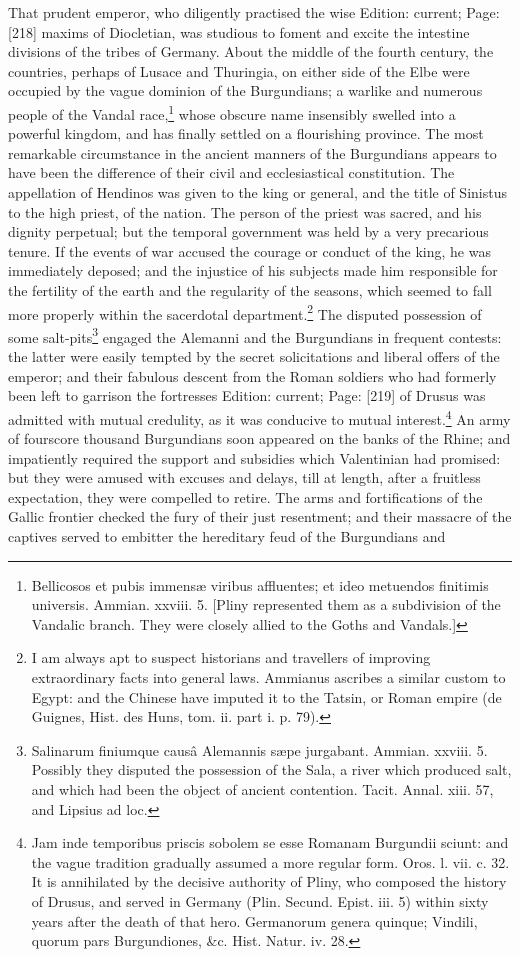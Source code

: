 That prudent emperor, who diligently practised the wise Edition: current; Page: [218] maxims of Diocletian, was studious to foment and excite the intestine divisions of the tribes of Germany. About the middle of the fourth century, the countries, perhaps of Lusace and Thuringia, on either side of the Elbe were occupied by the vague dominion of the Burgundians; a warlike and numerous people of the Vandal race,\footnote{Bellicosos et pubis immensæ viribus affluentes; et ideo metuendos finitimis universis. Ammian. xxviii. 5. [Pliny represented them as a subdivision of the Vandalic branch. They were closely allied to the Goths and Vandals.]} whose obscure name insensibly swelled into a powerful kingdom, and has finally settled on a flourishing province. The most remarkable circumstance in the ancient manners of the Burgundians appears to have been the difference of their civil and ecclesiastical constitution. The appellation of Hendinos was given to the king or general, and the title of Sinistus to the high priest, of the nation. The person of the priest was sacred, and his dignity perpetual; but the temporal government was held by a very precarious tenure. If the events of war accused the courage or conduct of the king, he was immediately deposed; and the injustice of his subjects made him responsible for the fertility of the earth and the regularity of the seasons, which seemed to fall more properly within the sacerdotal department.\footnote{I am always apt to suspect historians and travellers of improving extraordinary facts into general laws. Ammianus ascribes a similar custom to Egypt: and the Chinese have imputed it to the Tatsin, or Roman empire (de Guignes, Hist. des Huns, tom. ii. part i. p. 79).} The disputed possession of some salt-pits\footnote{Salinarum finiumque causâ Alemannis sæpe jurgabant. Ammian. xxviii. 5. Possibly they disputed the possession of the Sala, a river which produced salt, and which had been the object of ancient contention. Tacit. Annal. xiii. 57, and Lipsius ad loc.} engaged the Alemanni and the Burgundians in frequent contests: the latter were easily tempted by the secret solicitations and liberal offers of the emperor; and their fabulous descent from the Roman soldiers who had formerly been left to garrison the fortresses Edition: current; Page: [219] of Drusus was admitted with mutual credulity, as it was conducive to mutual interest.\footnote{Jam inde temporibus priscis sobolem se esse Romanam Burgundii sciunt: and the vague tradition gradually assumed a more regular form. Oros. l. vii. c. 32. It is annihilated by the decisive authority of Pliny, who composed the history of Drusus, and served in Germany (Plin. Secund. Epist. iii. 5) within sixty years after the death of that hero. Germanorum genera quinque; Vindili, quorum pars Burgundiones, \&c. Hist. Natur. iv. 28.} An army of fourscore thousand Burgundians soon appeared on the banks of the Rhine; and impatiently required the support and subsidies which Valentinian had promised: but they were amused with excuses and delays, till at length, after a fruitless expectation, they were compelled to retire. The arms and fortifications of the Gallic frontier checked the fury of their just resentment; and their massacre of the captives served to embitter the hereditary feud of the Burgundians and 